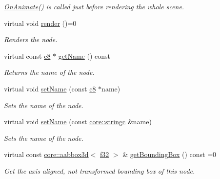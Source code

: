 \begin{DoxyCompactItemize}
\begin{DoxyCompactList}\small\item\em \hyperlink{classirr_1_1scene_1_1ISceneNode_afc1dcb5cb19116d0c7aa3d4ebdf04cc5}{On\+Animate()} is called just before rendering the whole scene. \end{DoxyCompactList}\item 
\mbox{\label{classirr_1_1scene_1_1ISceneNode_aff530cc4856792101d0aedee51ce35fa}} 
virtual void \hyperlink{classirr_1_1scene_1_1ISceneNode_aff530cc4856792101d0aedee51ce35fa}{render} ()=0
\begin{DoxyCompactList}\small\item\em Renders the node. \end{DoxyCompactList}\item 
virtual const \hyperlink{namespaceirr_a9395eaea339bcb546b319e9c96bf7410}{c8} $\ast$ \hyperlink{classirr_1_1scene_1_1ISceneNode_ab0e72b38949f926a1929468cd2b1ce16}{get\+Name} () const
\begin{DoxyCompactList}\small\item\em Returns the name of the node. \end{DoxyCompactList}\item 
virtual void \hyperlink{classirr_1_1scene_1_1ISceneNode_a810a54a2fc178b9a0e731513865f67d0}{set\+Name} (const \hyperlink{namespaceirr_a9395eaea339bcb546b319e9c96bf7410}{c8} $\ast$name)
\begin{DoxyCompactList}\small\item\em Sets the name of the node. \end{DoxyCompactList}\item 
virtual void \hyperlink{classirr_1_1scene_1_1ISceneNode_a20a22d956974f4817a20663361f20042}{set\+Name} (const \hyperlink{namespaceirr_1_1core_ade1071a878633f2f6d8a75c5d11fec19}{core\+::stringc} \&name)
\begin{DoxyCompactList}\small\item\em Sets the name of the node. \end{DoxyCompactList}\item 
virtual const \hyperlink{classirr_1_1core_1_1aabbox3d}{core\+::aabbox3d}$<$ \hyperlink{namespaceirr_a0277be98d67dc26ff93b1a6a1d086b07}{f32} $>$ \& \hyperlink{classirr_1_1scene_1_1ISceneNode_a223f718fc2f4944b5ad28c592f6cc8c6}{get\+Bounding\+Box} () const =0
\begin{DoxyCompactList}\small\item\em Get the axis aligned, not transformed bounding box of this node. \end{DoxyCompactList}\item 

\end{DoxyCompactItemize}

